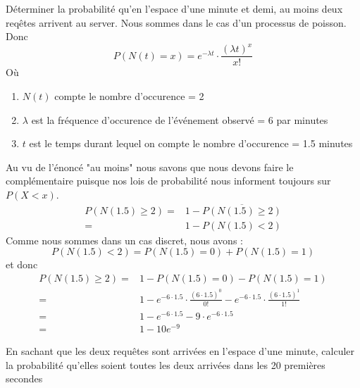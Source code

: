 \begin{exo}

  \begin{subexo}{Déterminer la probabilité qu'en l'espace d'une minute et demi,
      au moins deux reqêtes arrivent au server.}
    Nous sommes dans le cas d'un processus de poisson. Donc
    \[
      P(N(t) = x) = e^{-\lambda t} \cdot \frac{(\lambda t)^x}{x!}
    \]
    Où
    \begin{enumerate}
      \item $N(t)$ compte le nombre d'occurence = 2
      \item $\lambda$ est la fréquence d'occurence de l'événement observé = 6 par minutes
      \item $t$ est le temps durant lequel on compte le nombre d'occurence  = 1.5 minutes
    \end{enumerate}
    Au vu de l'énoncé "au moins" nous savons que nous devons faire le complémentaire puisque nos
    lois de probabilité nous informent toujours sur $P(X < x)$.
    \begin{align*}
      P(N(1.5) \ge 2) = & 1 - \overline{P(N(1.5) \ge 2)} \\
      =                 & 1 - P(N(1.5) < 2)
    \end{align*}
    Comme nous sommes dans un cas discret, nous avons :
    \[
      P(N(1.5) < 2) = P(N(1.5) = 0) + P(N(1.5) = 1)
    \]
    et donc
    \begin{align*}
      P(N(1.5) \ge 2) = & 1 - P(N(1.5) = 0) - P(N(1.5) = 1)                                                                         \\
      =                 & 1 - e^{-6 \cdot 1.5} \cdot \frac{(6 \cdot 1.5)^0}{0!} - e^{-6 \cdot 1.5 } \cdot \frac{(6\cdot 1.5)^1}{1!} \\
      =                 & 1- e^{-6 \cdot 1.5} - 9 \cdot e^{-6 \cdot 1.5}                                                            \\
      =                 & 1- 10e^{-9}
    \end{align*}
  \end{subexo}
  \begin{subexo}{En sachant que les deux requêtes sont arrivées en l'espace d'une minute, calculer
      la probabilité qu'elles soient toutes les deux arrivées dans les 20 premières secondes}


\end{subexo}
\end{exo}
